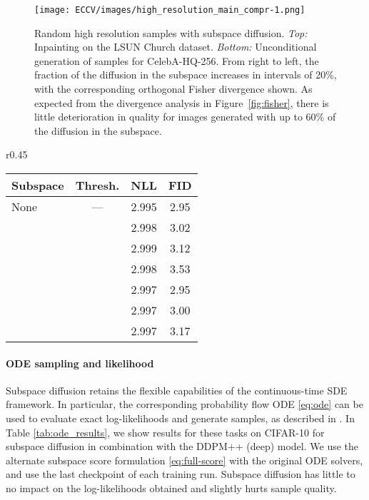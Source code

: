 \documentclass{article}
\begin{document}
\begin{figure}[t]
    \centering
    \texttt{[image: ECCV/images/high\_resolution\_main\_compr-1.png]}
    \caption{Random high resolution samples with  subspace diffusion. \textit{Top:} Inpainting on the  LSUN Church dataset. \textit{Bottom:} Unconditional generation of samples for CelebA-HQ-256. From right to left, the fraction of the diffusion in the subspace increases in intervals of 20\%, with the corresponding orthogonal Fisher divergence shown. As expected from the divergence analysis in Figure~\ref{fig:fisher}, there is little deterioration in quality for images generated with up to 60\% of the diffusion in the subspace.} 
    \label{fig:high_res}
\end{figure}

\begin{wraptable}[13]{r}{0.45\textwidth}
    \vspace{-12pt}
    \small \begin{tabular}{lccc}
    \toprule
    Subspace               & Thresh. & NLL    & FID    \\ \midrule
    None & --- & 2.995 & 2.95 \\ \midrule
    \multirow{3}{*}{} 
    &  & 2.998 & 3.02 \\
    &  & 2.999 & 3.12 \\
    &  & 2.998 & 3.53 \\ \midrule
    \multirow{3}{*}{} 
    &  & 2.997 & 2.95 \\
    &  & 2.997 & 3.00 \\
    &  & 2.997 & 3.17 \\ \bottomrule
    \end{tabular}
    \caption{ODE sampling and NLL evaluation on CIFAR-10 from DDPM++ (deep) with subspace diffusion.}
    \label{tab:ode_results}
\end{wraptable}
\paragraph{\textbf{ODE sampling and likelihood}} Subspace diffusion retains the flexible capabilities of the continuous-time SDE framework. In particular, the corresponding probability flow ODE \eqref{eq:ode} can be used to evaluate exact log-likelihoods and generate samples, as described in \cite{song2021score}. In Table \ref{tab:ode_results}, we show results for these tasks on CIFAR-10 for subspace diffusion in combination with the DDPM++ (deep) model. We use the alternate subspace score formulation \eqref{eq:full-score} with the original ODE solvers, and use the last checkpoint of each training run. Subspace diffusion has little to no impact on the log-likelihoods obtained and slightly hurts sample quality.
\end{document}
